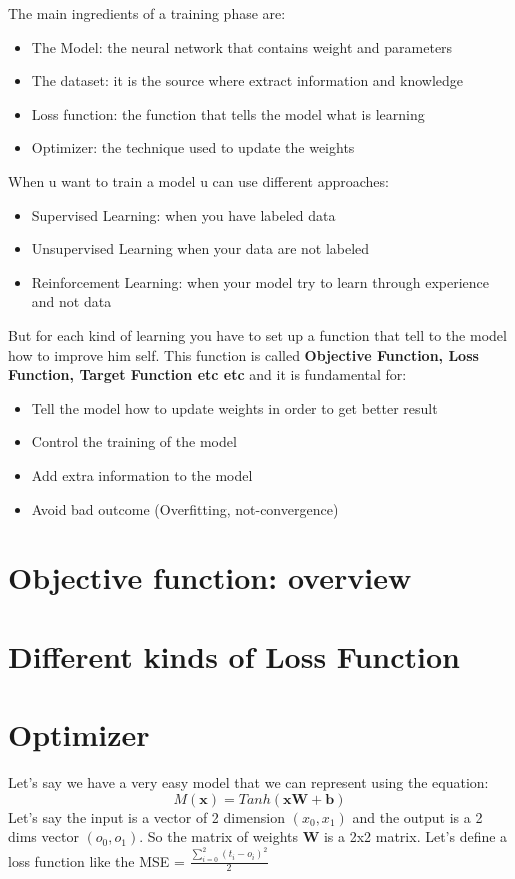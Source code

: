 The main ingredients of a training phase are:
\begin{itemize}
\item The Model: the neural network that contains weight and parameters
\item The dataset: it is the source where extract information and knowledge
\item Loss function: the function that tells the model what is learning
\item Optimizer: the technique used to update the weights
\end{itemize}
When u want to train a model u can use different approaches:
\begin{itemize}
\item Supervised Learning: when you have labeled data
\item Unsupervised Learning when your data are not labeled
\item Reinforcement Learning: when your model try to learn through experience and not data
\end{itemize}
But for each kind of learning you have to set up a function that tell to the model how to improve him self. This function is called \textbf{Objective Function, Loss Function, Target Function etc etc} and it is fundamental for:
\begin{itemize}
\item Tell the model how to update weights in order to get better result
\item Control the training of the model
\item Add extra information to the model
\item Avoid bad outcome (Overfitting, not-convergence)
\end{itemize}

\section{Objective function: overview}

\section{Different kinds of Loss Function}

\section{Optimizer}
Let's say we have a very easy model that we can represent using the equation:
\begin{equation}
M(\textbf{x}) = Tanh(\textbf{x}\textbf{W} + \textbf{b})
\end{equation}
Let's say the input is a vector of 2 dimension $(x_0, x_1)$ and the output is a 2 dims vector $(o_0, o_1)$. So the matrix of weights $\textbf{W}$ is a 2x2 matrix.
Let's define a loss function like the MSE = $\frac{\sum_{i=0}^2 (t_i - o_i)^2}{2}$

